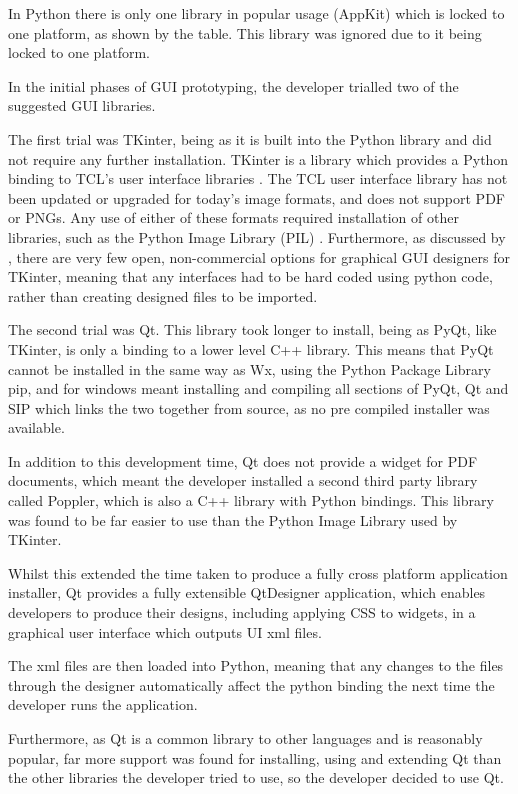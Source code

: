 In Python there is only one library in popular usage (AppKit) which is locked to one platform, as shown by the table. This library was ignored due to it being locked to one platform.

In the initial phases of GUI prototyping, the developer trialled two of the suggested GUI libraries.


The first trial was TKinter, being as it is built into the Python library and did not require any further installation. TKinter is a library which provides a Python binding to TCL's user interface libraries \parencite{PythonTCL}.
 The TCL user interface library has not been updated or upgraded for today's image formats, and does not support PDF or PNGs. Any use of either of these formats required installation of other libraries, such as the Python Image Library (PIL) \parencite{PIL}.
 Furthermore, as discussed by \cite{GuiProgramming}, there are very few open, non-commercial options for graphical GUI designers for TKinter, meaning that any interfaces had to be hard coded using python code, rather than creating designed files to be imported.
 
 
 The second trial was Qt. This library took longer to install, being as PyQt, like TKinter, is only a binding to a lower level C++ library. This means that PyQt cannot be installed in the same way as Wx, using the Python Package Library pip, and for windows meant installing and compiling all sections of PyQt, Qt and SIP which links the two together from source, as no pre compiled installer was available.
 
 In addition to this development time, Qt does not provide a widget for PDF documents, which meant the developer installed a second third party library called Poppler, which is also a C++ library with Python bindings. This library was found to be far easier to use than the Python Image Library used by TKinter.
 
 Whilst this extended the time taken to produce a fully cross platform application installer, Qt provides a fully extensible QtDesigner application, which enables developers to produce their designs, including applying CSS to widgets, in a graphical user interface which outputs UI xml files. 
 
 The xml files are then loaded into Python, meaning that any changes to the files through the designer automatically affect the python binding the next time the developer runs the application.

Furthermore, as Qt is a common library to other languages and is reasonably popular, far more support was found for installing, using and extending Qt than the other libraries the developer tried to use, so the developer decided to use Qt.

